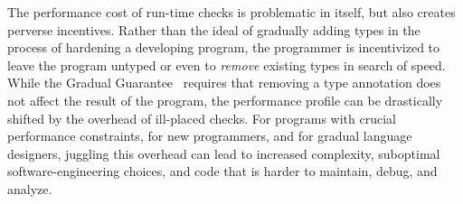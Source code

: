 The performance cost of run-time checks is problematic in itself,
but also creates perverse incentives. Rather than the ideal of
gradually adding types in the process of hardening a developing
program, the programmer is incentivized to leave the program untyped
or even to \textit{remove} existing types in search of speed.
%
While the Gradual Guarantee~\cite{XXXSiek2015} requires that
removing a type annotation does not affect the result of the
program, the performance profile can be drastically shifted by the
overhead of ill-placed checks.
%
For programs with crucial performance constraints, for new
programmers, and for gradual language designers, juggling this
overhead can lead to increased complexity, suboptimal
software-engineering choices, and code that is harder to maintain,
debug, and analyze.







